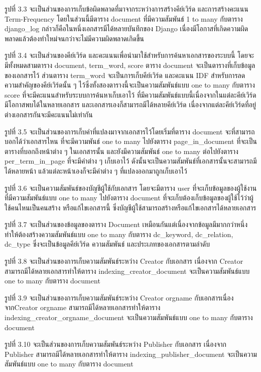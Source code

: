 รูปที่ 3.3 จะเป็นส่วนของการเก็บข้อผิดพลาดที่มาจากระหว่างการสร้างคีย์เวิร์ด และการสร้างคะแนน Term-Frequency  โดยในส่วนนี้มีตาราง document ที่มีความสัมพันธ์ 1 to many กับตาราง django\_log กล่าวก็คือในหนึ่งเอกสารมีได้หลายบันทึกของ Django เนื่องมีโอกาสที่เกิดความผิดพลาดแล้วต้องทำใหม่จนกว่าจะไม่มีความผิดพลาดเกิดขึ้น

รูปที่ 3.4 จะเป็นส่วนของคีย์เวิร์ด และคะแนนเพื่อนำมาใช้สำหรับการค้นหาเอกสารของระบบนี้ โดยจะมีทั้งหมดสามตาราง document, term\_word, score ตาราง document จะเป็นตารางที่เก็บข้อมูลของเอกสารไว้ ส่วนตาราง term\_word จะเป็นการเก็บคีย์เวิร์ด และคะแนน IDF สำหรับการลดความสำคัญของคีย์เวิร์ดนั้น ๆ ไว้ซึ่งทั้งสองตารางนี้จะเป็นความสัมพันธ์แบบ one to many กับตาราง score ที่จะมีคะแนนสำหรับระบบการค้นหาเก็บเอาไว้ ที่มีความสัมพันธ์แบบนี้เนื่องจากในแต่ละคีย์เวิร์ดมีโอกาสพบได้ในหลายเอกสาร และเอกสารเองก็สามารถมีได้หลายคีย์เวิร์ด เนื่องจากแต่ละคีย์เวิร์ดที่อยู่ต่างเอกสารกันจะมีคะแนนไม่เท่ากัน

รูปที่ 3.5 จะเป็นส่วนของการเก็บคำที่แปลงมาจากเอกสารไว้โดยเริ่มที่ตาราง document จะที่สามารถบอกได้ว่าเอกสารไหน ที่จะมีความพันธ์ one to many ไปยังตาราง page\_in\_document ที่จะเป็นตารางที่บอกถึงหน้าต่าง ๆ ในเอกสารนั้น และยังมีความสัมพันธ์ one to many ต่อไปยังตาราง per\_term\_in\_page ที่จะมีคำต่าง ๆ เก็บเอาไว้ ดังนั้นจะเป็นความสัมพันธ์ที่เอกสารนั้นจะสามารถมีได้หลายหน้า แล้วแต่ละหน้าเองก็จะมีคำต่าง ๆ ที่แปลงออกมาถูกเก็บเอาไว้

รูปที่ 3.6 จะเป็นความสัมพันธ์ของบัญชีผู้ใช้กับเอกสาร โดยจะมีตาราง user ที่จะเก็บข้อมูลของผู้ใช้งานที่มีความสัมพันธ์แบบ one to many ไปยังตาราง document ที่จะเก็บต้องเก็บข้อมูลของผู้ใช้ไว้ว่าผู้ใช้คนไหนเป็นคนสร้าง หรือแก้ไขเอกสารนี้ ซึ่งบัญชีผู้ใช้สามารถสร้างหรือแก้ไขเอกสารได้หลายเอกสาร

รูปที่ 3.7 จะเป็นส่วนของข้อมูลของตาราง Document เหมือนกันแต่เนื่องจากข้อมูลมีมากกว่าหนึ่งทำให้ต้องสร้างความสัมพันธ์แบบ one to many กับตาราง dc\_keyword, dc\_relation, dc\_type ซึ่งจะเป็นข้อมูลคีย์เวิร์ด ความสัมพันธ์ และประเภทของเอกสารตามลำดับ

รูปที่ 3.8 จะเป็นส่วนของการเก็บความสัมพันธ์ระหว่าง Creator กับเอกสาร เนื่องจาก Creator สามารถมีได้หลายเอกสารทำให้ตาราง indexing\_creator\_document จะเป็นความสัมพันธ์แบบ one to many กับตาราง document 

รูปที่ 3.9 จะเป็นส่วนของการเก็บความสัมพันธ์ระหว่าง Creator orgname กับเอกสารเนื่อง จากCreator orgname สามารถมีได้หลายเอกสารทำให้ตาราง indexing\_creator\_orgname\_document จะเป็นความสัมพันธ์แบบ one to many กับตาราง document 

รูปที่ 3.10 จะเป็นส่วนของการเก็บความสัมพันธ์ระหว่าง Publisher กับเอกสาร เนื่องจาก Publisher สามารถมีได้หลายเอกสารทำให้ตาราง indexing\_publisher\_document จะเป็นความสัมพันธ์แบบ one to many กับตาราง document 

